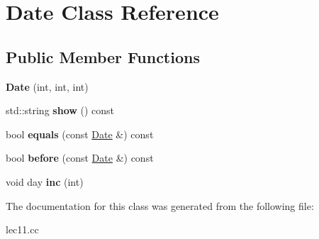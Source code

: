 \hypertarget{class_date}{}\section{Date Class Reference}
\label{class_date}
\subsection*{Public Member Functions}
\begin{DoxyCompactItemize}
\item 
\mbox{\label{class_date_af80a5016fde0d599f0a15900193fc663}} 
{\bfseries Date} (int, int, int)
\item 
\mbox{\label{class_date_acc0fb02f232c1b663638dea3f8f7310d}} 
std\+::string {\bfseries show} () const
\item 
\mbox{\label{class_date_a05863ad9f2645e0647ec2e99b7b7b969}} 
bool {\bfseries equals} (const \hyperlink{class_date}{Date} \&) const
\item 
\mbox{\label{class_date_acc09d1920e5e84ebb1df67eaa6311ed8}} 
bool {\bfseries before} (const \hyperlink{class_date}{Date} \&) const
\item 
\mbox{\label{class_date_aa2752470eca3ee03ca6d0eebb6099cea}} 
void day {\bfseries inc} (int)
\end{DoxyCompactItemize}


The documentation for this class was generated from the following file\+:\begin{DoxyCompactItemize}
\item 
lec11.\+cc\end{DoxyCompactItemize}
